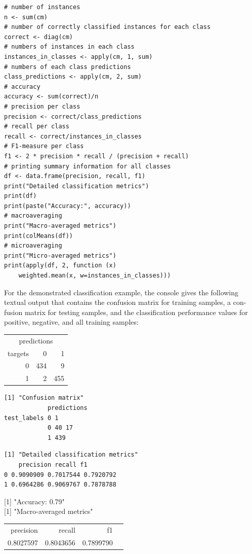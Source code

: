 \documentclass[10pt]{book}
\begin{document}
\begin{verbatim}
# number of instances
n <- sum(cm)
# number of correctly classified instances for each class
correct <- diag(cm)
# numbers of instances in each class
instances_in_classes <- apply(cm, 1, sum)
# numbers of each class predictions
class_predictions <- apply(cm, 2, sum)
# accuracy
accuracy <- sum(correct)/n
# precision per class
precision <- correct/class_predictions
# recall per class
recall <- correct/instances_in_classes
# F1-measure per class
f1 <- 2 * precision * recall / (precision + recall)
# printing summary information for all classes
df <- data.frame(precision, recall, f1)
print("Detailed classification metrics")
print(df)
print(paste("Accuracy:", accuracy))
# macroaveraging
print("Macro-averaged metrics")
print(colMeans(df))
# microaveraging
print("Micro-averaged metrics")
print(apply(df, 2, function (x)
    weighted.mean(x, w=instances_in_classes)))
\end{verbatim}

For the demonstrated classification example, the console gives the following textual output that contains the confusion matrix for training samples, a con-\\
fusion matrix for testing samples, and the classification performance values for positive, negative, and all training samples:

\begin{center}
\begin{tabular}{rrr}
\multicolumn{3}{c}{predictions} \\
targets & 0 & 1 \\
0 & 434 & 9 \\
1 & 2 & 455 \\
\end{tabular}
\end{center}

\begin{verbatim}
[1] "Confusion matrix"
            predictions
test_labels 0 1
            0 40 17
            1 439
\end{verbatim}

\begin{verbatim}
[1] "Detailed classification metrics"
    precision recall f1
0 0.9090909 0.7017544 0.7920792
1 0.6964286 0.9069767 0.7878788
\end{verbatim}

[1] "Accuracy: 0.79"\\[0pt]
[1] "Macro-averaged metrics"

\begin{center}
\begin{tabular}{rrrr}
precision & recall & f1 \\
0.8027597 & 0.8043656 & 0.7899790 \\
\end{tabular}
\end{center}
\end{document}
